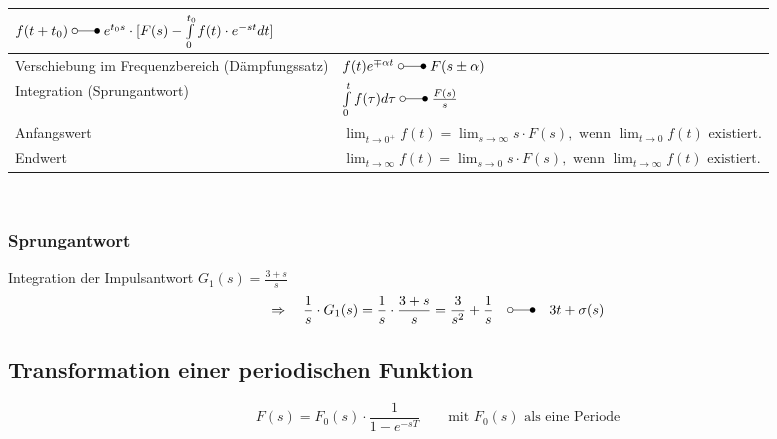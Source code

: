 \begin{tabular}{|l|l|}
  					$f(t + t_0) \; \laplace \; e^{t_0 s} \cdot [F(s) - \int\limits_0^{t_0} f(t) \cdot e^{-st} dt]$\\
  					\hline
  		 			Verschiebung im Frequenzbereich (Dämpfungssatz) &
  		 			$f(t)e^{\mp\alpha t} \; \laplace \; F(s\pm\alpha)$ \\
  		 			\hline
  		 			Integration (Sprungantwort)&
  		 			$\int\limits_0^t f(\tau)d\tau \; \laplace \; \frac{F(s)}{s}$ \\
  		 			\hline
  		 			Anfangswert &
  		 			$\lim_{t\rightarrow 0^+} f(t) = \lim_{s\rightarrow \infty} s\cdot F(s),\text{~wenn
  		 			}  \lim_{t\rightarrow 0} f(t)\text{~existiert}.$ \\
  		 			\hline
  		 			Endwert &
  		 			$\lim_{t\rightarrow \infty} f(t) = \lim_{s\rightarrow 0} s\cdot F(s),\text{~wenn
  		 			}  \lim_{t\rightarrow \infty} f(t)\text{~existiert}.$ \\
  		 			\hline
  		       	\end{tabular}\\
  		  \renewcommand{\arraystretch}{1.8}
  				
	\subsubsection{Sprungantwort} 
	Integration der Impulsantwort $G_1(s) = \frac{3+s}{s}$\\ 
	\[\Rightarrow \quad \frac{1}{s}\cdot G_1(s)= \frac{1}{s}\cdot\frac{3+s}{s}=\frac{3}{s^2}+\frac{1}{s} \quad \laplace \quad 3t +\sigma(s)\]
	
	\subsection{Transformation einer periodischen Funktion }
		\[ F(s) = F_0(s)\cdot\dfrac{1}{1 - e^{-sT}} \qquad \text{mit } F_0(s) \text{ als eine Periode}\] 


\newpage
